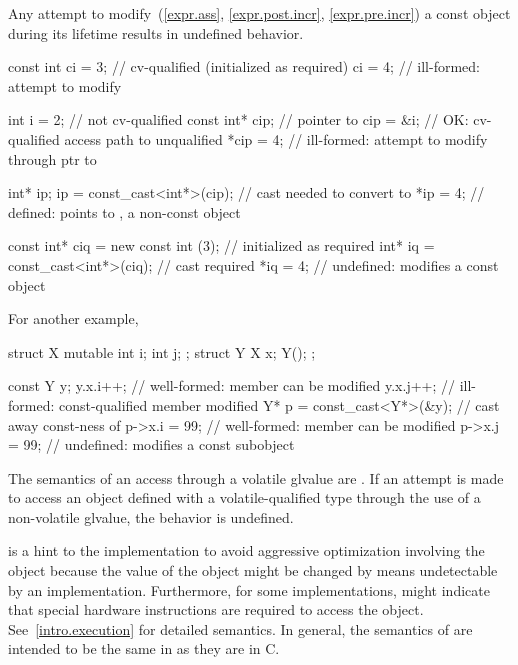 \pnum
{}%
Any attempt to modify~(\ref{expr.ass},
\ref{expr.post.incr}, \ref{expr.pre.incr}) a
const object during its
lifetime results in undefined behavior.
\begin{example}
\begin{codeblock}
const int ci = 3;                       // cv-qualified (initialized as required)
ci = 4;                                 // ill-formed: attempt to modify 

int i = 2;                              // not cv-qualified
const int* cip;                         // pointer to 
cip = &i;                               // OK: cv-qualified access path to unqualified
*cip = 4;                               // ill-formed: attempt to modify through ptr to 

int* ip;
ip = const_cast<int*>(cip);             // cast needed to convert  to 
*ip = 4;                                // defined:  points to , a non-const object

const int* ciq = new const int (3);     // initialized as required
int* iq = const_cast<int*>(ciq);        // cast required
*iq = 4;                                // undefined: modifies a const object
\end{codeblock}
For another example,
\begin{codeblock}
struct X {
  mutable int i;
  int j;
};
struct Y {
  X x;
  Y();
};

const Y y;
y.x.i++;                                // well-formed:  member can be modified
y.x.j++;                                // ill-formed: const-qualified member modified
Y* p = const_cast<Y*>(&y);              // cast away const-ness of 
p->x.i = 99;                            // well-formed:  member can be modified
p->x.j = 99;                            // undefined: modifies a const subobject
\end{codeblock}
\end{example}

\pnum
The semantics of an access through a volatile glvalue are
.
If an attempt is made to access an object defined with a
volatile-qualified type through the use of a non-volatile glvalue,
the behavior is undefined.

\pnum
{}%
%
\begin{note}
 is a hint to the implementation to avoid aggressive
optimization involving the object because the value of the object might
be changed by means undetectable by an implementation.
Furthermore, for some implementations,  might indicate that
special hardware instructions are required to access the object.
See~\ref{intro.execution} for detailed semantics. In general, the
semantics of  are intended to be the same in \Cpp{} as
they are in C.
\end{note}

